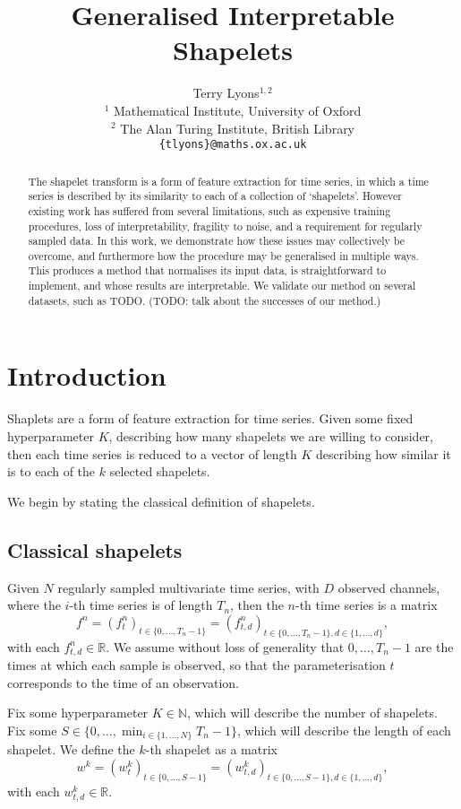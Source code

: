 \documentclass{article}
\title{Generalised Interpretable Shapelets}
\author{
	\And
	Terry Lyons$^{1, 2}$
	\AND \\[-12pt]
	\null$^1$ Mathematical Institute, University of Oxford \\
	\null$^2$ The Alan Turing Institute, British Library \\
	\texttt{\{tlyons\}@\hspace{0.1pt}maths.ox.ac.uk}
}
\theoremstyle{plain}
\theoremstyle{definition}
\newcommand{\reals}{\mathbb{R}}
\newcommand{\naturals}{\mathbb{N}}
\begin{document}
	\maketitle
	\begin{abstract}
		The shapelet transform is a form of feature extraction for time series, in which a time series is described by its similarity to each of a collection of `shapelets'. However existing work has suffered from several limitations, such as expensive training procedures, loss of interpretability, fragility to noise, and a requirement for regularly sampled data. In this work, we demonstrate how these issues may collectively be overcome, and furthermore how the procedure may be generalised in multiple ways. This produces a method that normalises its input data, is straightforward to implement, and whose results are interpretable. We validate our method on several datasets, such as TODO. (TODO: talk about the successes of our method.)
	\end{abstract}
	\section{Introduction}
	Shaplets are a form of feature extraction for time series. Given some fixed hyperparameter $K$, describing how many shapelets we are willing to consider, then each time series is reduced to a vector of length $K$ describing how similar it is to each of the $k$ selected shapelets.
	
	We begin by stating the classical definition of shapelets.
	\subsection{Classical shapelets}
	Given $N$ regularly sampled multivariate time series, with $D$ observed channels, where the $i$-th time series is of length $T_n$, then the $n$-th time series is a matrix 
	\begin{equation}\label{eq:f-n}
	f^n = (f^n_{t})_{t \in \{0, \ldots, T_n - 1\}} = (f^n_{t, d})_{t \in \{0, \ldots, T_n - 1\}, d \in \{1, \ldots, d\}},
	\end{equation}
	with each $f^n_{t, d} \in \reals$. We assume without loss of generality that $0, \ldots, T_n - 1$ are the times at which each sample is observed, so that the parameterisation $t$ corresponds to the time of an observation.
	
	Fix some hyperparameter $K \in \naturals$, which will describe the number of shapelets. Fix some $S \in \{0, \ldots, \min_{i \in \{1, \ldots, N\}}T_n - 1\}$, which will describe the length of each shapelet. We define the $k$-th shapelet as a matrix
	\begin{equation*}
	w^{k} = (w^{k}_t)_{t \in \{0, \ldots, S - 1\}} = (w^{k}_{t, d})_{t \in \{0, \ldots, S - 1\}, d \in \{1, \ldots, d\}},
	\end{equation*}
	with each $w^{k}_{t, d} \in \reals$.
	
\end{document}
